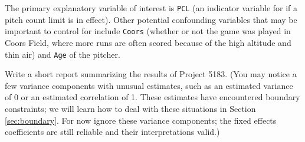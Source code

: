 \documentclass[
]{krantz}
\begin{document}
\begin{enumerate}
  The primary explanatory variable of interest is \texttt{PCL} (an indicator variable for if a pitch count limit is in effect). Other potential confounding variables that may be important to control for include \texttt{Coors} (whether or not the game was played in Coors Field, where more runs are often scored because of the high altitude and thin air) and \texttt{Age} of the pitcher.

  Write a short report summarizing the results of Project 5183. (You may notice a few variance components with unusual estimates, such as an estimated variance of 0 or an estimated correlation of 1. These estimates have encountered boundary constraints; we will learn how to deal with these situations in Section \ref{sec:boundary}. For now ignore these variance components; the fixed effects coefficients are still reliable and their interpretations valid.)
\end{enumerate}

  
\end{document}
